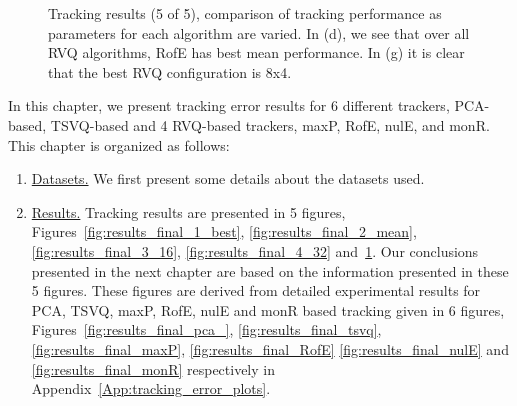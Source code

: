 \begin{figure}[h!]
								\caption{Tracking results (5 of 5), comparison of tracking performance as parameters for each algorithm are varied.  In (d), we see that over all RVQ algorithms, RofE has best mean performance.  In (g) it is clear that the best RVQ configuration is 8x4.}
								\label{fig:results_final_5_configs}
								\end{figure}

In this chapter, we present tracking error results for 6 different trackers, PCA-based, TSVQ-based and 4 RVQ-based trackers, maxP, RofE, nulE, and monR.  This chapter is organized as follows:

\begin{enumerate}
\item \underline{Datasets.}  We first present some details about the datasets used.
\item \underline{Results.}  Tracking results are presented in 5 figures, Figures~\ref{fig:results_final_1_best}, \ref{fig:results_final_2_mean}, \ref{fig:results_final_3_16}, \ref{fig:results_final_4_32} and~\ref{fig:results_final_5_configs}.  Our conclusions presented in the next chapter are based on the information presented in these 5 figures. These figures are derived from detailed experimental results for PCA, TSVQ, maxP, RofE, nulE and monR based tracking given in 6 figures, Figures~\ref{fig:results_final_pca_}, \ref{fig:results_final_tsvq}, \ref{fig:results_final_maxP}, \ref{fig:results_final_RofE} \ref{fig:results_final_nulE} and \ref{fig:results_final_monR} respectively in Appendix~\ref{App:tracking_error_plots}.   
\end{enumerate}

